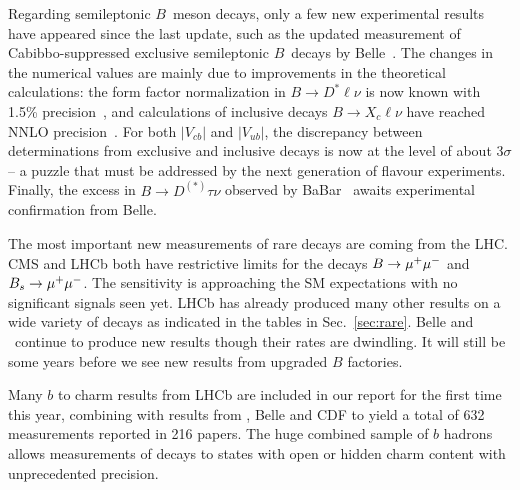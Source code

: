 Regarding semileptonic $B$~meson decays, only a few new experimental
results have appeared since the last update, such as the updated measurement
of Cabibbo-suppressed exclusive semileptonic $B$~decays by
Belle~\cite{Sibidanov:2013rkk}. The changes in the numerical values
are mainly due to improvements in the theoretical calculations: the
form factor normalization in $B\to D^*\ell\nu$ is now known with 1.5\%
precision~\cite{Bailey:2014tva}, and calculations of inclusive decays
$B\to X_c\ell\nu$ have reached NNLO
precision~\cite{Gambino:2011cq}. For both $|V_{cb}|$ and $|V_{ub}|$,
the discrepancy between determinations from exclusive and inclusive
decays is now at the level of about 3$\sigma$ -- a puzzle that must be
addressed by the next generation of flavour experiments. Finally, the
excess in $B\to D^{(*)}\tau\nu$ observed by BaBar~\cite{Lees:2012xj}
awaits experimental confirmation from Belle.

The most important new measurements of rare decays are coming from the
LHC.  CMS and LHCb both have restrictive limits for the decays
$B\to\mu^+\mu^-$ and $B_s\to\mu^+\mu^-$.  The sensitivity is approaching the SM
expectations with no significant signals seen yet.  LHCb has already
produced many other results on a wide variety of decays as indicated in 
the tables in Sec.~\ref{sec:rare}.  Belle and \babar\ continue to
produce new results though their rates are dwindling.  It will still
be some years before we see new results from upgraded $B$ factories.

Many $b$ to charm results from LHCb are included in our report for the  
first time this year, combining with
results from \babar, Belle and CDF to yield a total of 632  
measurements reported in 216 papers.
The huge combined sample of $b$ hadrons allows measurements of decays  
to states with open or hidden charm
content with unprecedented precision.

